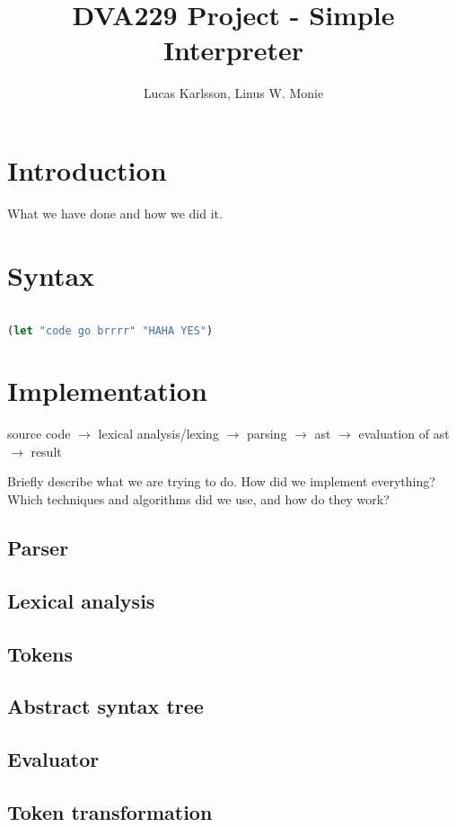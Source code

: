 \documentclass[11pt]{article}
\title{DVA229 Project - Simple Interpreter}
\author{Lucas Karlsson, Linus W. Monie}
\begin{document}
\maketitle

\section*{Introduction}
	What we have done and how we did it.

\section{Syntax}

\begin{lstlisting}[language=lisp]

(let "code go brrrr" "HAHA YES")

\end{lstlisting}

\section{Implementation}
	source code $\rightarrow$ lexical analysis/lexing $\rightarrow$ parsing $\rightarrow$ ast $\rightarrow$ evaluation of ast $\rightarrow$ result

Briefly describe what we are trying to do. How did we implement everything? Which techniques and algorithms did we use, and how do they work?

\subsection{Parser}

	\subsection{Lexical analysis}
	\subsection{Tokens}
	\subsection{Abstract syntax tree}

\subsection{Evaluator}

	\subsection{Token transformation}
\end{document}

